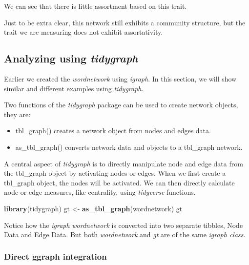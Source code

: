 \documentclass[
]{article}
\newenvironment{Shaded}{\begin{snugshade}}{\end{snugshade}}
\newcommand{\FunctionTok}[1]{\textcolor[rgb]{0.13,0.29,0.53}{\textbf{#1}}}
\newcommand{\NormalTok}[1]{#1}
\newcommand{\OtherTok}[1]{\textcolor[rgb]{0.56,0.35,0.01}{#1}}
\providecommand{\tightlist}{%
  \setlength{\itemsep}{0pt}\setlength{\parskip}{0pt}}
\begin{document}
We can see that there is little assortment based on this trait.

Just to be extra clear, this network still exhibits a community structure, but the trait we are measuring does not exhibit assortativity.

\hypertarget{analyzing-using-tidygraph}{%
\subsection{\texorpdfstring{Analyzing using \emph{tidygraph}}{Analyzing using tidygraph}}\label{analyzing-using-tidygraph}}

Earlier we created the \emph{wordnetwork} using \emph{igraph}. In this section, we will show similar and different examples using \emph{tidygraph}.

Two functions of the \emph{tidygraph} package can be used to create network objects, they are:

\begin{itemize}
\tightlist
\item
  tbl\_graph() creates a network object from nodes and edges data.
\item
  as\_tbl\_graph() converts network data and objects to a tbl\_graph network.
\end{itemize}

A central aspect of \emph{tidygraph} is to directly manipulate node and edge data from the tbl\_graph object by activating nodes or edges. When we first create a tbl\_graph object, the nodes will be activated. We can then directly calculate node or edge measures, like centrality, using \emph{tidyverse} functions.

\footnotesize

\begin{Shaded}
\begin{Highlighting}[]
\FunctionTok{library}\NormalTok{(tidygraph)}
\NormalTok{gt }\OtherTok{\textless{}{-}} \FunctionTok{as\_tbl\_graph}\NormalTok{(wordnetwork)}
\NormalTok{gt}
\end{Highlighting}
\end{Shaded}

\normalsize

Notice how the \emph{igraph} \emph{wordnetwork} is converted into two separate tibbles, Node Data and Edge Data. But both \emph{wordnetwork} and \emph{gt} are of the same \emph{igraph class}.

\hypertarget{direct-ggraph-integration}{%
\subsubsection{Direct ggraph integration}\label{direct-ggraph-integration}}
\end{document}
